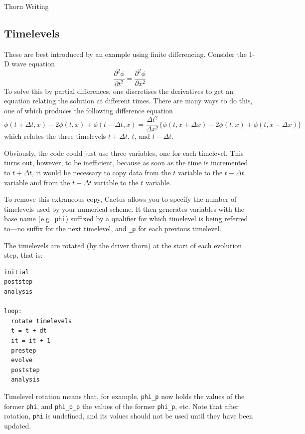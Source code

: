 \begin{cactuspart}{Thorn Writing}

\subsection{Timelevels}

These are best introduced by an example using finite differencing.
Consider the 1-D wave equation
\begin{equation}
\frac{\partial^2 \phi}{\partial t^2} = \frac{\partial^2 \phi}{\partial x^2}
\end{equation}
To solve this by partial differences, one discretises the derivatives to get
an equation relating the solution at different times.  There are many ways
to do this, one of which produces the following difference equation
\begin{equation}
\label{equation:difference}
\phi(t+\Delta t,x) -2\phi(t,x) +\phi(t-\Delta t,x) = \frac{\Delta t^2}{\Delta x^2} \lbrace{\phi(t,x+\Delta x) -2\phi(t,x) +\phi(t,x-\Delta x)}\rbrace
\end{equation}
which relates the three timelevels $t+\Delta t$, $t$, and $t-\Delta t$.

Obviously, the code could just use three variables, one for each timelevel.
This turns out, however, to be inefficient, because as soon as the time is
incremented to $t+\Delta t$, it would be necessary to copy data from the
$t$ variable to the $t-\Delta t$ variable and from the $t+\Delta t$ variable
to the $t$ variable.

To remove this extraneous copy, Cactus allows you to specify the number
of timelevels used by your numerical scheme.  It then generates variables
with the base name (e.g.\ \texttt{phi}) suffixed by a qualifier for
which timelevel is being referred to---no suffix for the
next timelevel, and \texttt{\_p} for each previous timelevel.

The timelevels are rotated (by the driver thorn) at the start
of each evolution step, that is:
\begin{verbatim}
initial
poststep
analysis

loop:
  rotate timelevels
  t = t + dt
  it = it + 1
  prestep
  evolve
  poststep
  analysis
\end{verbatim}

Timelevel rotation means that, for example,
\texttt{phi\_p} now holds the values of the former \texttt{phi},
and \texttt{phi\_p\_p} the values of the former \texttt{phi\_p}, etc.
Note that after rotation, \texttt{phi} is  undefined, and its values should
not be used until they have been updated.


\end{cactuspart}
